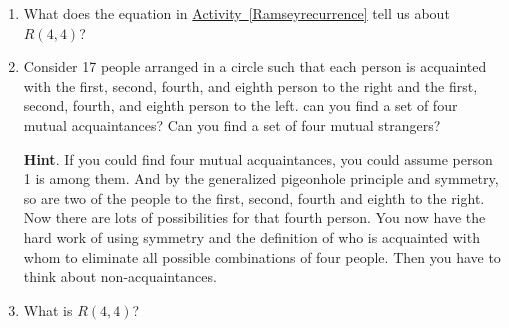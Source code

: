 \documentclass{book}
\begin{document}
\setcounter{cpjt}{53}
\addtocounter{cpjt}{-1}
\begin{activity}\label{Ramseybound2}
\leavevmode%
\begin{enumerate}[font=\bfseries,label=(\alph*),ref=\alph*]
\item\label{task-58} \hypertarget{p-422}{}%
What does the equation in \hyperref[Ramseyrecurrence]{Activity~\ref{Ramseyrecurrence}} tell us about \(R(4,4)\)?%
\par\smallskip%
\noindent\item\label{task-59} \hypertarget{p-424}{}%
Consider 17 people arranged in a circle such that each person is acquainted with the first, second, fourth, and eighth person to the right and the first, second, fourth, and eighth person to the left.  can you find a set of four mutual acquaintances?  Can you find a set of four mutual strangers?%
\par\smallskip%
\noindent\textbf{Hint}.\hypertarget{hint-23}{}\quad%
\hypertarget{p-425}{}%
If you could find four mutual acquaintances, you could assume person 1 is among them. And by the generalized pigeonhole principle and symmetry, so are two of the people to the first, second, fourth and eighth to the right. Now there are lots of possibilities for that fourth person. You now have the hard work of using symmetry and the definition of who is acquainted with whom to eliminate all possible combinations of four people. Then you have to think about non-acquaintances.%
\par\smallskip%
\noindent\item\label{task-60} \hypertarget{p-427}{}%
What is \(R(4,4)\)?%
\end{enumerate}
\end{activity}

\clearpage
\end{document}
